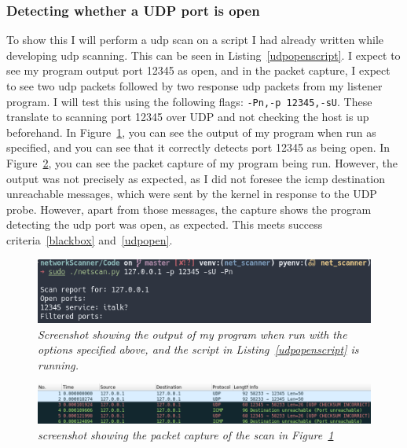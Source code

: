 \documentclass[titlepage]{article}
\let\Oldsubsubsection\subsubsection{}
\renewcommand{\subsubsection}{\FloatBarrier\Oldsubsubsection}
\begin{document}
\subsubsection{Detecting whether a UDP port is open}
To show this I will perform a \gls{udp} scan on a script I had already written while
developing \gls{udp} scanning.
This can be seen in Listing~\ref{udpopenscript}.
I expect to see my program output port 12345 as open, and in the packet capture, I
expect to see two \gls{udp} packets followed by two response \gls{udp} packets from my
listener program. I will test this using the following flags: \verb|-Pn,-p 12345,-sU|.
These translate to scanning port 12345 over UDP and not checking the host is up beforehand.
In Figure~\ref{udpopenoutput}, you can see the output of my program when run as specified,
and you can see that it correctly detects port 12345 as being open.
In Figure~\ref{udpopenpcap}, you can see the packet capture of my program being run.
However, the output was not precisely as expected,
as I did not foresee the \gls{icmp} destination unreachable messages,
which were sent by the kernel in response to the UDP probe.
However, apart from those messages,
the capture shows the program detecting the \gls{udp} port was open,
as expected. This meets success criteria~\ref{blackbox} and~\ref{udpopen}.



\begin{figure}[H]
  \centering
  \includegraphics[width=\textwidth]{udpopenoutput.png}
  \caption{\textit{%
    Screenshot showing the output of my program when run with the options specified
    above, and the script in Listing~\ref{udpopenscript} is running.
}}\label{udpopenoutput}
\end{figure}

\begin{figure}[H]
  \centering
  \includegraphics[width=\textwidth]{udpopenpcap.png}
  \caption{\textit{%
    screenshot showing the packet capture of the scan in Figure~\ref{udpopenoutput}
}}\label{udpopenpcap}
\end{figure}
\end{document}
